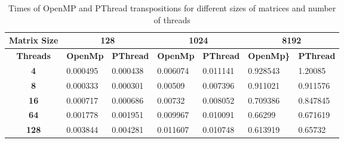 \documentclass[10pt,onecolumn]{article}
\begin{document}
    \begin{table}[htpb!]
    \centering
    \caption{Times of OpenMP and PThread transpositions for different sizes of matrices and number of threads}
    \label{my-label}
    \begin{tabular}{|c|l|l|l|l|l|l|}
    \hline
    \textbf{Matrix Size} & \multicolumn{2}{c|}{\textbf{128}}                                            & \multicolumn{2}{c|}{\textbf{1024}}                                           & \multicolumn{2}{c|}{\textbf{8192}}                                             \\ \hline
    \textbf{Threads}     & \multicolumn{1}{c|}{\textbf{OpenMp}} & \multicolumn{1}{c|}{\textbf{PThread}} & \multicolumn{1}{c|}{\textbf{OpenMp}} & \multicolumn{1}{c|}{\textbf{PThread}} & \multicolumn{1}{c|}{\textbf{OpenMp\}}} & \multicolumn{1}{c|}{\textbf{PThread}} \\ \hline
    \textbf{4}           & 0.000495                             & 0.000438                              & 0.006074                             & 0.011141                              & 0.928543                               & 1.20085                               \\ \hline
    \textbf{8}           & 0.000333                             & 0.000301                              & 0.00509                              & 0.007396                              & 0.911021                               & 0.911576                              \\ \hline
    \textbf{16}          & 0.000717                             & 0.000686                              & 0.00732                              & 0.008052                              & 0.709386                               & 0.847845                              \\ \hline
    \textbf{64}          & 0.001778                             & 0.001951                              & 0.009967                             & 0.010091                              & 0.66299                                & 0.671619                              \\ \hline
    \textbf{128}         & 0.003844                             & 0.004281                              & 0.011607                             & 0.010748                              & 0.613919                               & 0.65732                               \\ \hline
    \end{tabular}
    \end{table}
    
\end{document}
